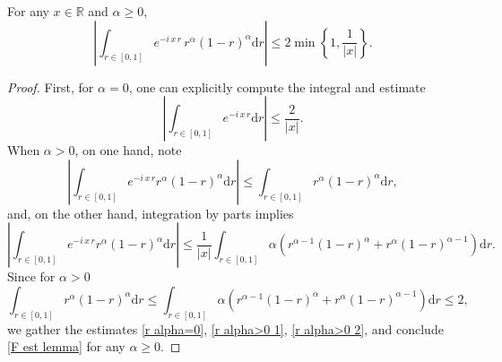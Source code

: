 \documentclass[10pt,a4paper]{amsart}
\newcommand{\md}{\mathrm{d}}
\begin{document}
\begin{lemma}\label{Lemma F est} 
	For any $x \in \mathbb{R}$ and $\alpha\geq 0$,
	\begin{equation}\label{F est lemma}
		\left| \int_{r\in[0,1]} e^{-i  \, x \, r} \,  r^\alpha(1-r)^\alpha \md r  \right| \leq  2 \min \left\{ 1, \frac{1}{|x|} \right\}.
	\end{equation}
\end{lemma}

\begin{proof}
	First, for $\alpha=0$, one can explicitly compute the integral and estimate
	\begin{equation}\label{r alpha=0}
		\left| \int_{r\in[0,1]} e^{-i \, x  \, r}    \md r  \right| \leq  \frac{2}{|x|}.
	\end{equation}
	When $\alpha>0$, on one hand, note
	\begin{equation}\label{r alpha>0 1}
		\left| \int_{r\in[0,1]} e^{-i \, x \, r }  r^\alpha(1-r)^\alpha \md r \right| \leq  \int_{r\in[0,1]}  r^\alpha(1-r)^\alpha \md r,
	\end{equation}
	and, on the other hand,  integration by parts implies
	\begin{equation}\label{r alpha>0 2}
		\left| \int_{r\in[0,1]} e^{-i \,  x\,  r }  r^\alpha(1-r)^\alpha \md r  \right| \leq  \frac{1}{|x|  }  \int_{r\in[0,1]} \alpha \left( r^{\alpha-1}(1-r)^\alpha + r^\alpha (1-r)^{\alpha-1} \right) \md r.
	\end{equation}
	Since for $\alpha>0$
	\begin{equation*}
		\int_{r\in[0,1]}  r^\alpha(1-r)^\alpha \md r \leq \int_{r\in[0,1]} \alpha \left( r^{\alpha-1}(1-r)^\alpha + r^\alpha (1-r)^{\alpha-1} \right) \md r \leq 2,
	\end{equation*}
	we   gather the estimates  \eqref{r alpha=0}, \eqref{r alpha>0 1}, \eqref{r alpha>0 2}, and conclude \eqref{F est lemma} for any $\alpha\geq 0$.
\end{proof}
\end{document}
